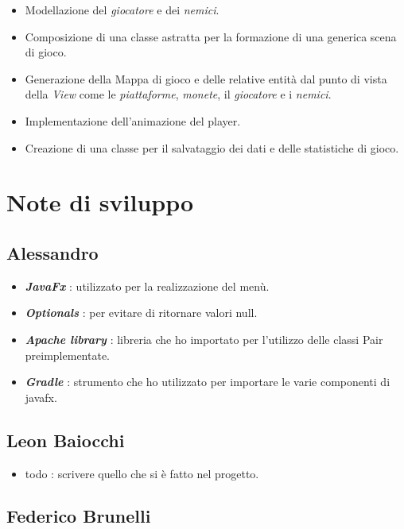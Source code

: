 \begin{itemize}
	\item  \textsf{\small Modellazione del \emph{giocatore} e dei \emph{nemici}.}
	\item \textsf{\small Composizione di una classe astratta per la formazione di una generica scena di gioco.}
	\item \textsf{\small Generazione della Mappa di gioco e delle relative entità dal punto di vista della \emph{View} come le \emph{piattaforme}, \emph{monete}, il \emph{giocatore} e i \emph{nemici}.}
	\item \textsf{\small Implementazione dell'animazione del player.}
	\item \textsf{\small Creazione di una classe per il salvataggio dei dati e delle statistiche di gioco.}
\end{itemize}

\section{Note di sviluppo}

\subsection*{Alessandro}

\begin{itemize}
	\item  \textbf{\textit{JavaFx}} : utilizzato per la realizzazione del menù.
	\item \textbf{\textit{Optionals}} : per evitare di ritornare valori null.
	\item \textbf{\textit{Apache library}} : libreria che ho importato per l'utilizzo delle classi Pair preimplementate.
	\item \textbf{\textit{Gradle}} : strumento che ho utilizzato per importare le varie componenti di javafx.
\end{itemize}

\subsection*{Leon Baiocchi}

\begin{itemize}
	\item  todo : scrivere quello che si è fatto nel progetto.
\end{itemize}

\subsection*{Federico Brunelli}

